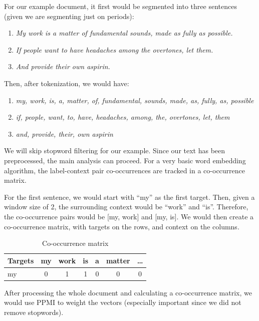For our example document, it first would be segmented into three sentences (given we are segmenting just on periods):

\begin{enumerate}
    \item \textit{My work is a matter of fundamental sounds, made as fully as possible.}
    \item \textit{If people want to have headaches among the overtones, let them.}
    \item \textit{And provide their own aspirin.}
\end{enumerate}

Then, after tokenization, we would have:

\begin{enumerate}
    \item \textit{my, work, is, a, matter, of, fundamental, sounds, made, as, fully, as, possible}
    \item \textit{if, people, want, to, have, headaches, among, the, overtones, let, them}
    \item \textit{and, provide, their, own aspirin}
\end{enumerate}

We will skip stopword filtering for our example. Since our text has been preprocessed, the main analysis can proceed. For a very basic word embedding algorithm, the label-context pair co-occurrences are tracked in a co-occurrence matrix.

For the first sentence, we would start with ``my'' as the first target. Then, given a window size of 2, the surrounding context would be ``work'' and ``is''. Therefore, the co-occurrence pairs would be [my, work] and [my, is]. We would then create a co-occurrence matrix, with targets on the rows, and context on the columns.

\begin{table}[h]
    \centering
    \begin{tabular}{|l|c|c|c|c|c|c|}
    \hline
    Targets & my & work & is & a & matter & \dots \\
    \hline
    my & 0 & 1 & 1 & 0 & 0 & 0 \\
    \hline
    \end{tabular}
    \caption{Co-occurrence matrix}
    \label{exampleCoocmat}
\end{table}

After processing the whole document and calculating a co-occurrence matrix, we would use PPMI to weight the vectors (especially important since we did not remove stopwords).

